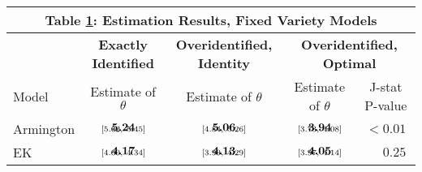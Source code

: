 \documentclass[12pt,dvips, ps2pdf]{article}
\renewcommand{\arraystretch}{1.1}
\begin{document}
\begin{table}[!h]
\footnotesize
{}
\renewcommand{\arraystretch}{1.65}
\setlength {\tabcolsep}{1.75mm}
\begin{center}\label{tb:data_rslts}
\begin{tabular}[t]{l c c c c }
\multicolumn{5}{c}{\normalsize \textbf{Table \ref{tb:data_rslts}: Estimation Results, Fixed Variety Models}}
\\
\hline
\hline
& \textbf{Exactly Identified} & \textbf{Overidentified, Identity} & \multicolumn{2}{c}{\textbf{Overidentified, Optimal}} \\
\cmidrule(r){2-2}  \cmidrule(lr){3-3} \cmidrule(lr){4-5}
Model &  Estimate of $\theta$ & Estimate of $ \theta$ & Estimate of $\theta$ & J-stat P-value \\
\hline
Armington   & $\begin{array}{c}{\textbf{5.24}} \vspace{-.4cm}\\ \scriptstyle{[5.02,   \ 5.45]}\end{array}$  & $\begin{array}{c}{\textbf{5.06}} \vspace{-.4cm}\\ \scriptstyle{[4.84,   \ 5.26]}\end{array}$ & $\begin{array}{c}{\textbf{3.94}} \vspace{-.4cm}\\ \scriptstyle{[3.73,   \ 4.08]}\end{array}$ & $< 0.01$\\
EK              & $\begin{array}{c}{\textbf{4.17}} \vspace{-.4cm}\\ \scriptstyle{[4.00,   \ 4.34]}\end{array}$  &  $\begin{array}{c}{\textbf{4.13}} \vspace{-.4cm}\\ \scriptstyle{[3.99,   \ 4.29]}\end{array}$  &  $\begin{array}{c}{\textbf{4.05}} \vspace{-.4cm}\\ \scriptstyle{[3.97,   \ 4.14]}\end{array}$  & $\phantom{<} 0.25$    \\

\end{tabular}
\end{center}
\end{table}
\end{document}
